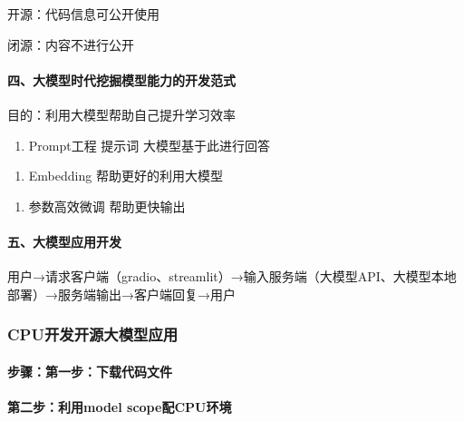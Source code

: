 \documentclass[
]{article}
\begin{document}
开源：代码信息可公开使用

闭源：内容不进行公开

\paragraph{四、大模型时代挖掘模型能力的开发范式}\label{ux56dbux5927ux6a21ux578bux65f6ux4ee3ux6316ux6398ux6a21ux578bux80fdux529bux7684ux5f00ux53d1ux8303ux5f0f}

目的：利用大模型帮助自己提升学习效率

\begin{enumerate}
\def\labelenumi{\arabic{enumi}.}
\item
  Prompt工程 提示词 大模型基于此进行回答
\end{enumerate}

\begin{enumerate}
\def\labelenumi{\arabic{enumi}.}
\item
  Embedding 帮助更好的利用大模型
\end{enumerate}

\begin{enumerate}
\def\labelenumi{\arabic{enumi}.}
\item
  参数高效微调 帮助更快输出
\end{enumerate}

\paragraph{五、大模型应用开发}\label{ux4e94ux5927ux6a21ux578bux5e94ux7528ux5f00ux53d1}

用户→请求客户端（gradio、streamlit）→输入服务端（大模型API、大模型本地部署）→服务端输出→客户端回复→用户

\subsubsection{CPU开发开源大模型应用}\label{cpuux5f00ux53d1ux5f00ux6e90ux5927ux6a21ux578bux5e94ux7528}

\paragraph{步骤：第一步：下载代码文件}\label{ux6b65ux9aa4ux7b2cux4e00ux6b65ux4e0bux8f7dux4ee3ux7801ux6587ux4ef6}

\paragraph{第二步：利用model
scope配CPU环境}\label{ux7b2cux4e8cux6b65ux5229ux7528model-scopeux914dcpuux73afux5883}
\end{document}
